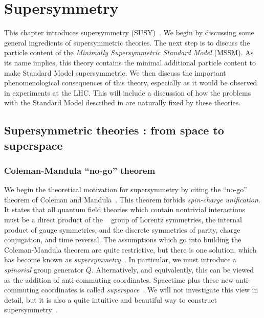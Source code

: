 

\chapter[Supersymmetry][Top of Page Title]{Supersymmetry}\label{ch:susy}

This chapter introduces supersymmetry (SUSY)~\cite{Miyazawa:1966mfa, Gervais:1971xj, Gervais:1971ji, Golfand:1971iw, Neveu:1971rx, Neveu:1971iv, Volkov:1973ix,  Wess:1973kz, Salam:1974ig, Ferrara:1974ac, Wess:1974tw, susyPrimer,Lykken:1996xt, archilSUSYLectures}.
We begin by discussing some general ingredients of supersymmetric theories.
The next step is to discuss the particle content of the \textit{Minimally Supersymmetric Standard Model} (MSSM).
As its name implies, this theory contains the minimal additional particle content to make Standard Model supersymmetric.
We then discuss the important phenomenological consequences of this theory, especially as it would be observed in experiments at the LHC.
This will include a discussion of how the problems with the Standard Model described in  are naturally fixed by these theories.

\section{Supersymmetric theories : from space to superspace}

\subsection{Coleman-Mandula ``no-go'' theorem}

We begin the theoretical motivation for supersymmetry by citing the ``no-go'' theorem of Coleman and Mandula~\cite{Coleman:1967ad}.
This theorem forbids \textit{spin-charge unification}.
It states that all quantum field theories which contain nontrivial interactions must be a direct product of the \Poincare~ group of Lorentz symmetries, the internal product of gauge symmetries, and the discrete symmetries of parity, charge conjugation, and time reversal.
The assumptions which go into building the Coleman-Mandula theorem are quite restrictive, but there is one solution, which has become known as \textit{supersymmetry}~\cite{Golfand:1971iw, Haag:1974qh}.
In particular, we must introduce a \textit{spinorial} group generator $Q$.
Alternatively, and equivalently, this can be viewed as the addition of anti-commuting coordinates.
Spacetime plus these new anti-commuting coordinates is called \textit{superspace}~\cite{Salam:1974jj}.
We will not investigate this view in detail, but it is also a quite intuitive and beautiful way to construct supersymmetry~\cite{susyPrimer}.

